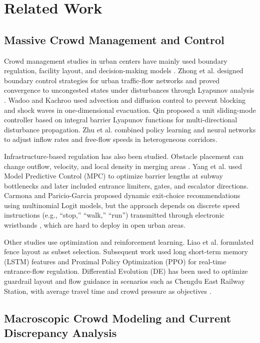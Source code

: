 \documentclass[lettersize,journal]{IEEEtran}
\begin{document}
\section{Related Work}
\label{sec:related}

\subsection{Massive Crowd Management and Control}

Crowd management studies in urban centers have mainly used boundary regulation, facility layout, and decision-making models \cite{RN2000,RN2193}.
Zhong et al. \cite{RN279} designed boundary control strategies for urban traffic-flow networks and proved convergence to uncongested states under disturbances through Lyapunov analysis \cite{RN1196}.
Wadoo and Kachroo \cite{RN280} used advection and diffusion control to prevent blocking and shock waves in one-dimensional evacuation.
Qin \cite{RN277} proposed a unit sliding-mode controller based on integral barrier Lyapunov functions for multi-directional disturbance propagation.
Zhu et al. \cite{RN286} combined policy learning and neural networks to adjust inflow rates and free-flow speeds in heterogeneous corridors.

Infrastructure-based regulation has also been studied.
Obstacle placement can change outflow, velocity, and local density in merging areas \cite{RN1662,RN2145}.
Yang et al. \cite{RN2118,RN2120} used Model Predictive Control (MPC) to optimize barrier lengths at subway bottlenecks and later included entrance limiters, gates, and escalator directions.
Carmona and Paricio-Garcia \cite{RN2119} proposed dynamic exit-choice recommendations using multinomial Logit models, but the approach depends on discrete speed instructions (e.g., ``stop,'' ``walk,'' ``run'') transmitted through electronic wristbands \cite{RN2196}, which are hard to deploy in open urban areas.

Other studies use optimization and reinforcement learning.
Liao et al. \cite{RN2121} formulated fence layout as subset selection.
Subsequent work \cite{RN2122} used long short-term memory (LSTM) features and Proximal Policy Optimization (PPO) \cite{RN2189} for real-time entrance-flow regulation.
Differential Evolution (DE) \cite{RN2190} has been used to optimize guardrail layout and flow guidance in scenarios such as Chengdu East Railway Station, with average travel time and crowd pressure as objectives \cite{RN2123}.

\subsection{Macroscopic Crowd Modeling and Current Discrepancy Analysis}
\end{document}
